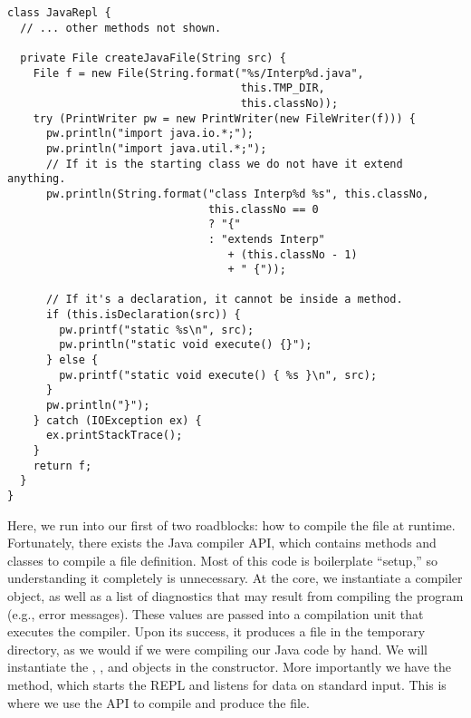 \begin{lstlisting}[language=MyJava]
class JavaRepl {
  // ... other methods not shown.
  
  private File createJavaFile(String src) {
    File f = new File(String.format("%s/Interp%d.java",
                                    this.TMP_DIR, 
                                    this.classNo));
    try (PrintWriter pw = new PrintWriter(new FileWriter(f))) {
      pw.println("import java.io.*;");
      pw.println("import java.util.*;");
      // If it is the starting class we do not have it extend anything.
      pw.println(String.format("class Interp%d %s", this.classNo,
                               this.classNo == 0
                               ? "{" 
                               : "extends Interp" 
                                  + (this.classNo - 1) 
                                  + " {"));

      // If it's a declaration, it cannot be inside a method.
      if (this.isDeclaration(src)) {
        pw.printf("static %s\n", src);
        pw.println("static void execute() {}");
      } else {
        pw.printf("static void execute() { %s }\n", src);
      }
      pw.println("}");
    } catch (IOException ex) {
      ex.printStackTrace();
    }
    return f;
  }
}
\end{lstlisting}

Here, we run into our first of two roadblocks: how to compile the file at runtime. 
Fortunately, there exists the Java compiler API, which contains methods and classes to compile a file definition. 
Most of this code is boilerplate ``setup,'' so understanding it completely is unnecessary. 
At the core, we instantiate a compiler object, as well as a list of diagnostics that may result from compiling the program (e.g., error messages). 
These values are passed into a compilation unit that executes the compiler. 
Upon its success, it produces a  file in the temporary directory, as we would if we were compiling our Java code by hand. 
We will instantiate the , , and  objects in the constructor. 
More importantly we have the  method, which starts the REPL and listens for data on standard input. 
This is where we use the API to compile and produce the  file.   

